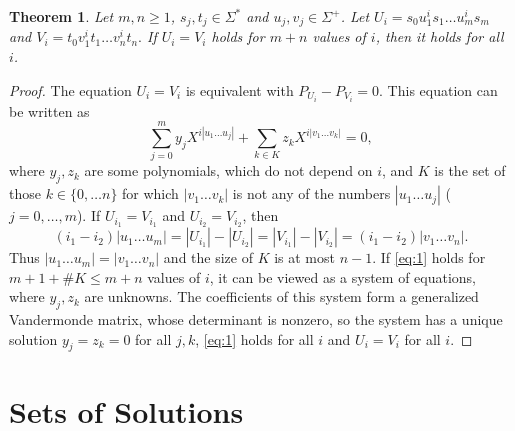 \documentclass[submission]{eptcs}
\newtheorem{theorem}{Theorem}[section]
\theoremstyle{definition}
\newcommand{\px}[1]{ P_{#1} }
\begin{document}
\begin{theorem}
Let $m,n \geq 1$, $s_j, t_j \in \Sigma^*$ and $u_j, v_j \in
\Sigma^+$. Let
\begin{math}
    U_i = s_0 u_1^i s_1 \dots u_m^i s_m
\end{math}
and
\begin{math}
    V_i = t_0 v_1^i t_1 \dots v_n^i t_n .
\end{math}
If $U_i = V_i$ holds for $m+n$ values of $i$, then it holds for all
$i$.
\end{theorem}
\begin{proof}
The equation $U_i = V_i$ is equivalent with $\px{U_i} - \px{V_i} =
0$.
This equation can be written as
\begin{equation} \label{eq:1}
    \sum_{j=0}^{m} y_j X^{i |u_1 \dots u_j|}
    + \sum_{k \in K} z_k X^{i |v_1 \dots v_k|} = 0,
\end{equation}
where $y_j, z_k$ are some polynomials, which do not depend on $i$,
and $K$ is the set of those $k \in \{0, \dots n\}$ for which $|v_1
\dots v_k|$ is not any of the numbers $|u_1 \dots u_j|$ ($j = 0,
\dots, m$). If $U_{i_1} = V_{i_1}$ and $U_{i_2} = V_{i_2}$, then
\begin{equation*}
    (i_1 - i_2) |u_1 \dots u_m| = |U_{i_1}| - |U_{i_2}|
    = |V_{i_1}| - |V_{i_2}| = (i_1 - i_2) |v_1 \dots v_n| .
\end{equation*}
Thus $|u_1 \dots u_m| = |v_1 \dots v_n|$ and the size of $K$ is at
most $n-1$. If \eqref{eq:1} holds for $m + 1 + \# K \leq m+n$ values
of $i$, it can be viewed as a system of equations, where $y_j, z_k$
are unknowns. The coefficients of this system form a generalized
Vandermonde matrix, whose determinant is nonzero, so the system has
a unique solution $y_j = z_k = 0$ for all $j, k$, \eqref{eq:1} holds
for all $i$ and $U_i = V_i$ for all $i$.
\end{proof}

\section{Sets of Solutions} \label{sect:solsets}
\end{document}
